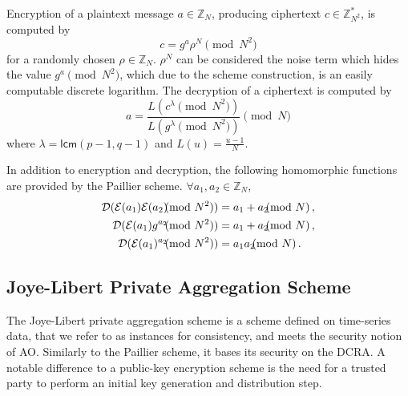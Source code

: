 \documentclass[10pt,letterpaper,oneside,twocolumn,journal]{IEEEtran}
\theoremstyle{definition}
\theoremstyle{definition}
\theoremstyle{remark}
\begin{document}
Encryption of a plaintext message $a \in \mathbb{Z}_N$, producing ciphertext $c \in \mathbb{Z}^{*}_{N^2}$, is computed by
\begin{equation}
    c = g^a \rho^N \pmod{N^2}
\end{equation}
for a randomly chosen $\rho \in \mathbb{Z}_{N}$. $\rho^N$ can be considered the noise term which hides the value $g^a \pmod{N^2}$, which due to the scheme construction, is an easily computable discrete logarithm. The decryption of a ciphertext is computed by
\begin{equation}
    a = \frac{L(c^\lambda\pmod{N^2})}{L(g^\lambda\pmod{N^2})} \pmod{N}
\end{equation}
where $\lambda = \mathsf{lcm}(p-1, q-1)$ and $L(u) = \frac{u-1}{N}$.

In addition to encryption and decryption, the following homomorphic functions are provided by the Paillier scheme. $\forall a_1,a_2 \in \mathbb{Z}_N$,
\begin{align}
    \mathcal{D}(\mathcal{E}(a_1)\mathcal{E}(a_2) \hspace{-7pt} \pmod{N^2}) &= a_1+a_2 \hspace{-7pt} \pmod{N}\,, \\
    \mathcal{D}(\mathcal{E}(a_1)g^{a_2} \hspace{-7pt} \pmod{N^2}) &= a_1+a_2\hspace{-7pt}\pmod{N}\,, \label{eqn:paillier_hom_plain_add}\\
    \mathcal{D}(\mathcal{E}(a_1)^{a_2} \hspace{-7pt} \pmod{N^2}) &= a_1a_2 \hspace{-7pt} \pmod{N}\,. \label{eqn:paillier_hom_mult}
\end{align}

% 
% 

\subsection{Joye-Libert Private Aggregation Scheme} \label{subsec:joye_libert_scheme}
The Joye-Libert private aggregation scheme \cite{joyeScalableSchemePrivacyPreserving2013} is a scheme defined on time-series data, that we refer to as instances for consistency, and meets the security notion of AO. Similarly to the Paillier scheme, it bases its security on the DCRA. A notable difference to a public-key encryption scheme is the need for a trusted party to perform an initial key generation and distribution step.
\end{document}
